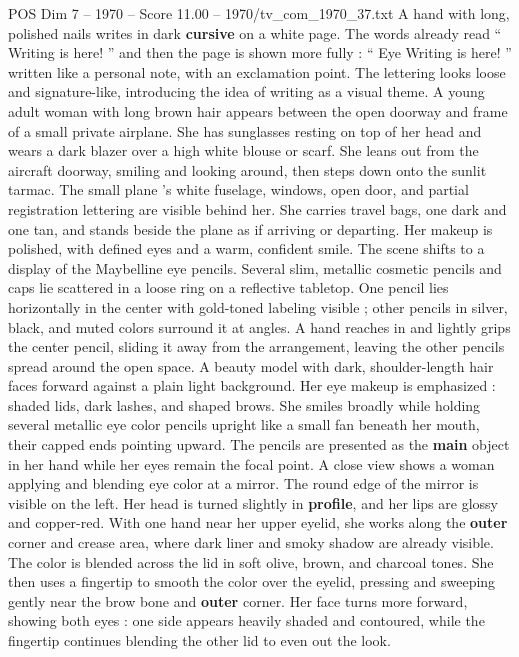 \begin{textsample}{POS Dim 7 – 1970 – Score 11.00 – 1970/tv\_com\_1970\_37.txt}  \label{ex:f7_pos_031}
A hand with long, polished nails writes in dark \textbf{cursive} on a white page.
The words already read “ Writing is here! ” and then the page is shown more fully : “ Eye Writing is here! ” written like a personal note, with an exclamation point.
The lettering looks loose and signature-like, introducing the idea of writing as a visual theme.
A young adult woman with long brown hair appears between the open doorway and frame of a small private airplane.
She has sunglasses resting on top of her head and wears a dark blazer over a high white blouse or scarf.
She leans out from the aircraft doorway, smiling and looking around, then steps down onto the sunlit tarmac.
The small plane ’s white fuselage, windows, open door, and partial registration lettering are visible behind her.
She carries travel bags, one dark and one tan, and stands beside the plane as if arriving or departing.
Her makeup is polished, with defined eyes and a warm, confident smile.
The scene shifts to a display of the Maybelline eye pencils.
Several slim, metallic cosmetic pencils and caps lie scattered in a loose ring on a reflective tabletop.
One pencil lies horizontally in the center with gold-toned labeling visible ; other pencils in silver, black, and muted colors surround it at angles.
A hand reaches in and lightly grips the center pencil, sliding it away from the arrangement, leaving the other pencils spread around the open space.
A beauty model with dark, shoulder-length hair faces forward against a plain light background.
Her eye makeup is emphasized : shaded lids, dark lashes, and shaped brows.
She smiles broadly while holding several metallic eye color pencils upright like a small fan beneath her mouth, their capped ends pointing upward.
The pencils are presented as the \textbf{main} object in her hand while her eyes remain the focal point.
A close view shows a woman applying and blending eye color at a mirror.
The round edge of the mirror is visible on the left.
Her head is turned slightly in \textbf{profile}, and her lips are glossy and copper-red.
With one hand near her upper eyelid, she works along the \textbf{outer} corner and crease area, where dark liner and smoky shadow are already visible.
The color is blended across the lid in soft olive, brown, and charcoal tones.
She then uses a fingertip to smooth the color over the eyelid, pressing and sweeping gently near the brow bone and \textbf{outer} corner.
Her face turns more forward, showing both eyes : one side appears heavily shaded and contoured, while the fingertip continues blending the other lid to even out the look.

\end{textsample}
